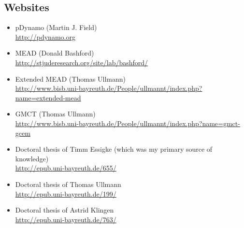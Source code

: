 \documentclass[a4paper,11pt]{article}
\begin{document}
{%
% 
% 
% 


\begingroup
    {\small
    \setlength{\bibsep}{8pt}
    
    }
\endgroup


\subsection*{Websites}

\begin{itemize}
\itemsep0em
  \item pDynamo (Martin J. Field)\\ \url{http://pdynamo.org}

  \item MEAD (Donald Bashford)\\ \url{http://stjuderesearch.org/site/lab/bashford/}

  \item Extended MEAD (Thomas Ullmann)\\ \url{http://www.bisb.uni-bayreuth.de/People/ullmannt/index.php?name=extended-mead}

  \item GMCT (Thomas Ullmann)\\ \url{http://www.bisb.uni-bayreuth.de/People/ullmannt/index.php?name=gmct-gcem}

  \item Doctoral thesis of Timm Essigke (which was my primary source of knowledge)\\ \url{http://epub.uni-bayreuth.de/655/}


  \item Doctoral thesis of Thomas Ullmann\\ \url{http://epub.uni-bayreuth.de/199/}

  \item Doctoral thesis of Astrid Klingen\\ \url{http://epub.uni-bayreuth.de/763/}
\end{itemize}
\end{document}
